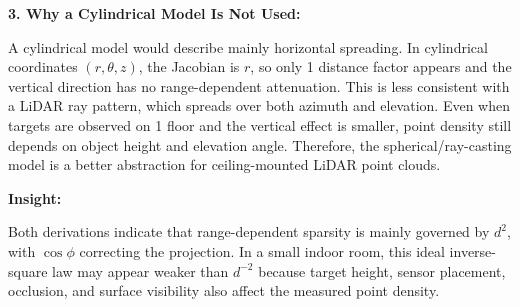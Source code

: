\documentclass[11pt,a4paper]{report}
\begin{document}
\begin{contentbox}
\vspace{0.25em}
\textbf{3. Why a Cylindrical Model Is Not Used:}

A cylindrical model would describe mainly horizontal spreading. In cylindrical coordinates $(r,\theta,z)$, the Jacobian is $r$, so only 1 distance factor appears and the vertical direction has no range-dependent attenuation. This is less consistent with a LiDAR ray pattern, which spreads over both azimuth and elevation. Even when targets are observed on 1 floor and the vertical effect is smaller, point density still depends on object height and elevation angle. Therefore, the spherical/ray-casting model is a better abstraction for ceiling-mounted LiDAR point clouds.

\vspace{0.25em}
\textbf{Insight:}

Both derivations indicate that range-dependent sparsity is mainly governed by $d^2$, with $\cos\phi$ correcting the projection. In a small indoor room, this ideal inverse-square law may appear weaker than $d^{-2}$ because target height, sensor placement, occlusion, and surface visibility also affect the measured point density.
\end{contentbox}
\end{document}
